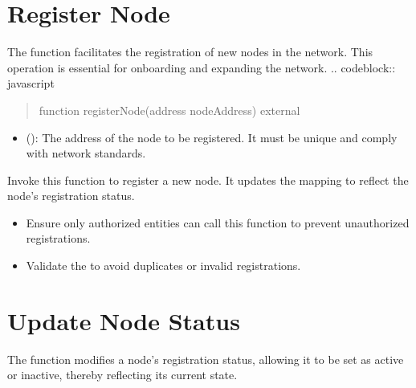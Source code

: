 \documentclass[a4paper,10pt,english]{sphinxmanual}
\begin{document}
\sphinxAtStartPar
{}


\section{Register Node}
\label{\detokenize{docs_node_manager_contract:register-node}}
\sphinxAtStartPar
The  function facilitates the registration of new nodes in the network. This operation is essential for onboarding and expanding the network.
.. code\sphinxhyphen{}block:: javascript
\begin{quote}

\sphinxAtStartPar
function registerNode(address nodeAddress) external
\end{quote}

\sphinxAtStartPar
{}
\begin{itemize}
\item {} 
\sphinxAtStartPar
{} ():
The address of the node to be registered. It must be unique and comply with network standards.

\end{itemize}

\sphinxAtStartPar
{}

\sphinxAtStartPar
Invoke this function to register a new node. It updates the  mapping to reflect the node’s registration status.

\sphinxAtStartPar
{}
\begin{itemize}
\item {} 
\sphinxAtStartPar
{} Ensure only authorized entities can call this function to prevent unauthorized registrations.

\item {} 
\sphinxAtStartPar
{} Validate the  to avoid duplicates or invalid registrations.

\end{itemize}


\section{Update Node Status}
\label{\detokenize{docs_node_manager_contract:update-node-status}}
\sphinxAtStartPar
The  function modifies a node’s registration status, allowing it to be set as active or inactive, thereby reflecting its current state.
\end{document}

